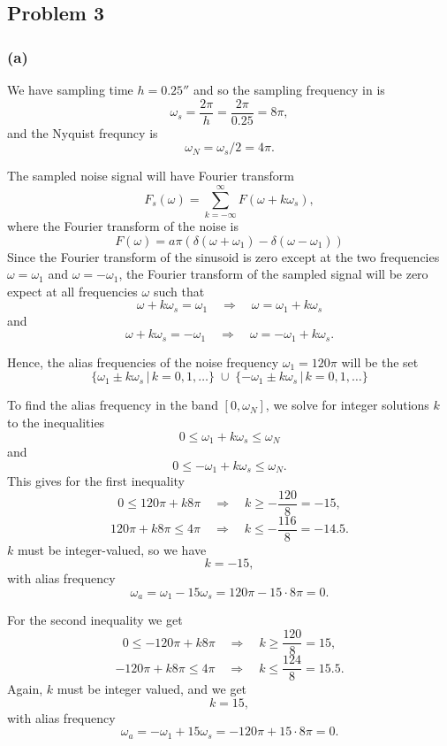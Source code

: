 \documentclass{scrartcl}
\begin{document}
\subsection*{Problem 3}
\label{sec:orgheadline20}

\subsubsection*{(a)}
\label{sec:orgheadline18}
We have sampling time \(h=\unit{0.25}{\second}\) and so the sampling frequency in \unit{}{\rad\per\second} is
\[\omega_s = \frac{2\pi}{h} = \frac{2\pi}{0.25} = 8 \pi, \]
and the Nyquist frequncy is 
\[ \omega_N = \omega_s/2 = 4 \pi. \]

The sampled noise signal will have Fourier transform
\[ F_s(\omega) = \sum_{k=-\infty}^\infty F(\omega + k\omega_s), \]
where the Fourier transform of the noise is 
\[ F(\omega) =  a\pi\left( \delta(\omega + \omega_1) - \delta(\omega - \omega_1) \right) \]
Since the Fourier transform of the sinusoid is zero except at the two frequencies \(\omega = \omega_1\) and \(\omega=-\omega_1\), the Fourier transform of the sampled signal will be zero expect at all frequencies \(\omega\) such that
\[ \omega + k\omega_s = \omega_1 \quad \Rightarrow \quad \omega = \omega_1 + k\omega_s\]
and
\[ \omega + k\omega_s = -\omega_1 \quad \Rightarrow \quad \omega = -\omega_1 + k\omega_s.\]

Hence, the alias frequencies of the noise frequency \(\omega_1 = 120\pi\) will be the set
\[ \{\omega_1 \pm k\omega_s\,|\, k=0,1,\ldots \} \; \cup \; \{-\omega_1 \pm k\omega_s\,|\, k=0,1,\ldots \} \]

To find the alias frequency in the band \([0, \omega_N]\), we solve for integer solutions \(k\) to the inequalities
\[ 0 \le \omega_1 + k\omega_s \le \omega_N \]
and
\[ 0 \le -\omega_1 + k\omega_s \le \omega_N. \]
This gives for the first inequality
\[ 0 \le 120\pi + k8\pi \quad \Rightarrow \quad k \ge -\frac{120}{8} = -15, \]
\[ 120\pi + k8\pi \le 4\pi \quad \Rightarrow \quad k \le -\frac{116}{8} = -14.5. \]
\(k\) must be integer-valued, so we have
\[ k = -15, \]
with alias frequency
\[ \omega_a = \omega_1 - 15\omega_s = 120\pi - 15\cdot 8 \pi = 0. \]

For the second inequality we get
\[ 0 \le -120\pi + k8\pi \quad \Rightarrow \quad k \ge \frac{120}{8} = 15, \]
\[ -120\pi + k8\pi \le 4\pi \quad \Rightarrow \quad k \le \frac{124}{8} = 15.5. \]
Again, \(k\) must be integer valued, and we get 
\[ k = 15, \]
with alias frequency
\[ \omega_a = -\omega_1 + 15\omega_s = -120\pi + 15\cdot 8 \pi = 0. \]
\end{document}

